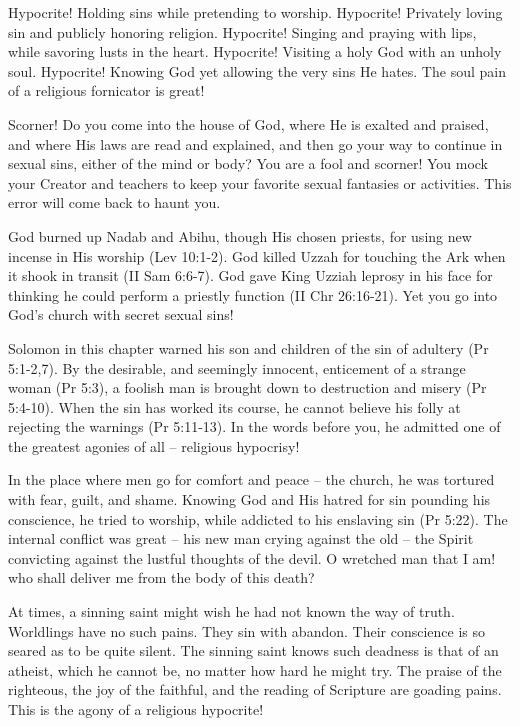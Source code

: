 Hypocrite! Holding sins while pretending to worship. Hypocrite! Privately loving sin and publicly honoring religion. Hypocrite! Singing and praying with lips, while savoring lusts in the heart. Hypocrite! Visiting a holy God with an unholy soul. Hypocrite! Knowing God yet allowing the very sins He hates. The soul pain of a religious fornicator is great!

Scorner! Do you come into the house of God, where He is exalted and praised, and where His laws are read and explained, and then go your way to continue in sexual sins, either of the mind or body? You are a fool and scorner! You mock your Creator and teachers to keep your favorite sexual fantasies or activities. This error will come back to haunt you.

God burned up Nadab and Abihu, though His chosen priests, for using new incense in His worship (Lev 10:1-2). God killed Uzzah for touching the Ark when it shook in transit (II Sam 6:6-7). God gave King Uzziah leprosy in his face for thinking he could perform a priestly function (II Chr 26:16-21). Yet you go into God’s church with secret sexual sins!

Solomon in this chapter warned his son and children of the sin of adultery (Pr 5:1-2,7). By the desirable, and seemingly innocent, enticement of a strange woman (Pr 5:3), a foolish man is brought down to destruction and misery (Pr 5:4-10). When the sin has worked its course, he cannot believe his folly at rejecting the warnings (Pr 5:11-13). In the words before you, he admitted one of the greatest agonies of all – religious hypocrisy!

In the place where men go for comfort and peace – the church, he was tortured with fear, guilt, and shame. Knowing God and His hatred for sin pounding his conscience, he tried to worship, while addicted to his enslaving sin (Pr 5:22). The internal conflict was great – his new man crying against the old – the Spirit convicting against the lustful thoughts of the devil. O wretched man that I am! who shall deliver me from the body of this death?

At times, a sinning saint might wish he had not known the way of truth. Worldlings have no such pains. They sin with abandon. Their conscience is so seared as to be quite silent. The sinning saint knows such deadness is that of an atheist, which he cannot be, no matter how hard he might try. The praise of the righteous, the joy of the faithful, and the reading of Scripture are goading pains. This is the agony of a religious hypocrite!

